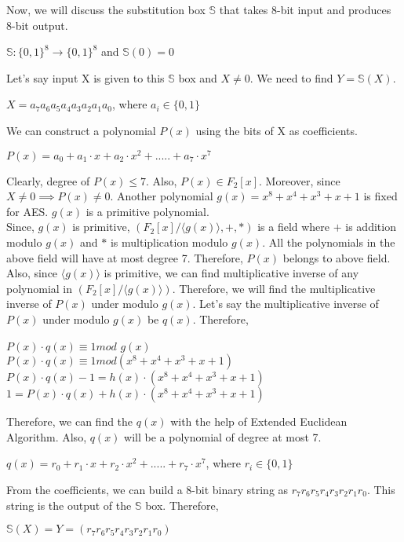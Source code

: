 \documentclass[11pt]{article}
\begin{document}
Now, we will discuss the substitution box $\mathbb{S}$ that takes 8-bit input and produces 8-bit output.
\begin{center}
    $\mathbb{S}: \{0, 1\}^8 \rightarrow \{0, 1\}^8$ and $\mathbb{S}(0) = 0$
\end{center}
Let's say input X is given to this $\mathbb{S}$ box and $X \neq 0$. We need to find $Y = \mathbb{S}(X)$.
\begin{center}
    $X = a_7a_6a_5a_4a_3a_2a_1a_0$, where $a_i \in \{0, 1\}$
\end{center}
We can construct a polynomial $P(x)$ using the bits of X as coefficients.
\begin{center}
    $P(x) = a_0 + a_1 \cdot x + a_2 \cdot x^2 +.....+ a_7 \cdot x^7$
\end{center}
Clearly, degree of $P(x) \leq 7$. Also, $P(x) \in F_2[x]$. Moreover, since $X \neq 0 \implies P(x) \neq 0$. Another polynomial $g(x) = x^8 + x^4 + x^3 + x + 1$ is fixed for AES. $g(x)$ is a primitive polynomial.\\
\newline
Since, $g(x)$ is primitive, $(F_2[x]/\langle g(x) \rangle, +, *)$ is a field where $+$ is addition modulo $g(x)$ and $*$ is multiplication modulo $g(x)$. All the polynomials in the above field will have at most degree 7. Therefore, $P(x)$ belongs to above field. Also, since $\langle g(x) \rangle$ is primitive, we can find multiplicative inverse of any polynomial in $(F_2[x]/\langle g(x) \rangle)$. Therefore, we will find the multiplicative inverse of $P(x)$ under modulo $g(x)$. Let's say the multiplicative inverse of $P(x)$ under modulo $g(x)$ be $q(x)$. Therefore, 
\begin{center}
    $P(x)\cdot q(x) \equiv 1 mod $ $g(x)$\\
    \vspace{1mm}
    $P(x) \cdot q(x) \equiv 1 mod (x^8 + x^4 + x^3 + x + 1)$\\
    \vspace{1mm}
    $P(x)\cdot q(x) - 1 = h(x) \cdot (x^8 + x^4 + x^3 + x + 1)$\\
    \vspace{1mm}
    $1 = P(x) \cdot q(x) + h(x) \cdot (x^8 + x^4 + x^3 + x + 1)$
\end{center}
Therefore, we can find the $q(x)$ with the help of Extended Euclidean Algorithm. Also, $q(x)$ will be a polynomial of degree at most 7.
\begin{center}
    $q(x) = r_0 + r_1\cdot x+ r_2 \cdot x^2 +.....+ r_7 \cdot x^7$, where $r_i \in \{0, 1\}$
\end{center}
From the coefficients, we can build a 8-bit binary string as $r_7r_6r_5r_4r_3r_2r_1r_0$. This string is the output of the $\mathbb{S}$ box. Therefore,
\begin{center}
    $\mathbb{S}(X) = Y = (r_7r_6r_5r_4r_3r_2r_1r_0)$
\end{center}
\end{document}
